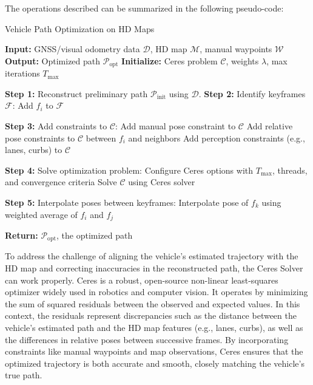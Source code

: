 The operations described can be summarized in the following pseudo-code:
\begin{algorithm}[H]
\caption{Vehicle Path Optimization on HD Maps}
\begin{algorithmic}[1]
\State \textbf{Input:} GNSS/visual odometry data $\mathcal{D}$, HD map $\mathcal{M}$, manual waypoints $\mathcal{W}$
\State \textbf{Output:} Optimized path $\mathcal{P}_{\text{opt}}$
\State \textbf{Initialize:} Ceres problem $\mathcal{C}$, weights $\lambda$, max iterations $T_{\text{max}}$

\State \textbf{Step 1:} Reconstruct preliminary path $\mathcal{P}_{\text{init}}$ using $\mathcal{D}$.
\State \textbf{Step 2:} Identify keyframes $\mathcal{F}$:
        \State Add $f_i$ to $\mathcal{F}$
    \EndIf
\EndFor

\State \textbf{Step 3:} Add constraints to $\mathcal{C}$:
        \State Add manual pose constraint to $\mathcal{C}$
    \EndIf
    \State Add relative pose constraints to $\mathcal{C}$ between $f_i$ and neighbors
    \State Add perception constraints (e.g., lanes, curbs) to $\mathcal{C}$
\EndFor

\State \textbf{Step 4:} Solve optimization problem:
\State Configure Ceres options with $T_{\text{max}}$, threads, and convergence criteria
\State Solve $\mathcal{C}$ using Ceres solver

\State \textbf{Step 5:} Interpolate poses between keyframes:
        \State Interpolate pose of $f_k$ using weighted average of $f_i$ and $f_j$
    \EndFor
\EndFor

\State \textbf{Return:} $\mathcal{P}_{\text{opt}}$, the optimized path
\end{algorithmic}
\end{algorithm}

To address the challenge of aligning the vehicle's estimated trajectory with the HD map and correcting inaccuracies in the reconstructed path, the Ceres Solver \cite{Agarwal_Ceres_Solver_2022} can work properly. Ceres is a robust, open-source non-linear least-squares optimizer widely used in robotics and computer vision. It operates by minimizing the sum of squared residuals between the observed and expected values. In this context, the residuals represent discrepancies such as the distance between the vehicle's estimated path and the HD map features (e.g., lanes, curbs), as well as the differences in relative poses between successive frames. By incorporating constraints like manual waypoints and map observations, Ceres ensures that the optimized trajectory is both accurate and smooth, closely matching the vehicle's true path. 

